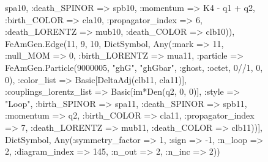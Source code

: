 \documentclass{revtex4}
\begin{document}
\begin{figure}[!htb]
\begin{center}
{spa10, :death_SPINOR => spb10, :momentum => K4 - q1 + q2, :birth_COLOR => cla10, :propagator_index => 6, :death_LORENTZ => mub10, :death_COLOR => clb10)), FeAmGen.Edge(11, 9, 10, Dict{Symbol, Any}(:mark => 11, :null_MOM => 0, :birth_LORENTZ => mua11, :particle => FeAmGen.Particle(9000005, "ghG", "ghGbar", :ghost, :octet, 0//1, 0, 0), :color_list => Basic[DeltaAdj(clb11, cla11)], :couplings_lorentz_list => Basic[im*Den(q2, 0, 0)], :style => "Loop", :birth_SPINOR => spa11, :death_SPINOR => spb11, :momentum => q2, :birth_COLOR => cla11, :propagator_index => 7, :death_LORENTZ => mub11, :death_COLOR => clb11))], Dict{Symbol, Any}(:symmetry_factor => 1, :sign => -1, :n_loop => 2, :diagram_index => 145, :n_out => 2, :n_inc => 2)) 
}
\end{center}
\end{figure}
\end{document}
